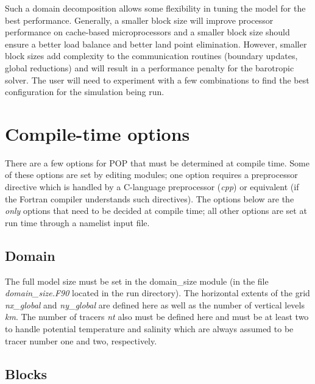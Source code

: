 Such a domain decomposition allows some flexibility
in tuning the model for the best performance.  Generally,
a smaller block size will improve processor performance
on cache-based microprocessors and a smaller block
size should ensure a better load balance and better
land point elimination.  However,
smaller block sizes add complexity to the communication
routines (boundary updates, global reductions) and
will result in a performance penalty for the barotropic
solver.  The user will need to experiment
with a few combinations to find the best configuration
for the simulation being run.

\section{Compile-time options}\label{sec:compile-opts}

There are a few options for POP that must be determined at
compile time. Some of these options are set by editing
modules; one option requires a preprocessor
directive which is handled by a
C-language preprocessor ({\em cpp}) or equivalent (if the
Fortran compiler understands such directives).  The
options below are the {\em only} options that need to
be decided at compile time; all other options are set
at run time through a namelist input file.

\subsection{Domain}\label{sec:compile-domain}

The full model size must be set in the domain\_size module
(in the file {\em domain\_size.F90} located in the run directory).
The horizontal extents of the grid {\em nx\_global} and
{\em ny\_global} are defined here as well as the number of
vertical levels {\em km}.  The number of tracers
{\em nt} also must be defined here and must be at least two
to handle potential temperature and salinity which are always
assumed to be tracer number one and two, respectively.

\subsection{Blocks}\label{sec:compile-blocks}

